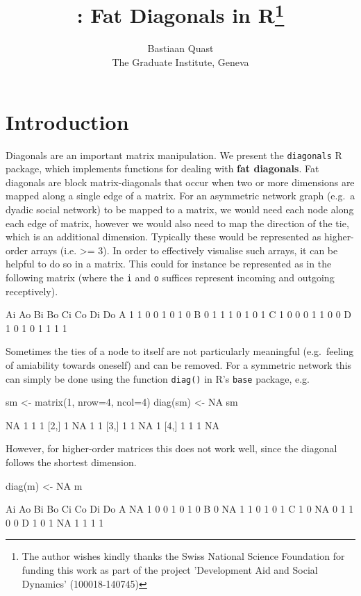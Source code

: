\documentclass[article]{jss}
\author{
Bastiaan Quast\\The Graduate Institute, Geneva
}
\title{\pkg{diagonals}: Fat Diagonals in
R\thanks{The author wishes kindly thanks the Swiss National Science Foundation for funding this work as part of the project 'Development Aid and Social Dynamics' (100018-140745)}}
\begin{document}
\section{Introduction}\label{introduction}

Diagonals are an important matrix manipulation. We present the
\texttt{diagonals} R package, which implements functions for dealing
with \textbf{fat diagonals}. Fat diagonals are block matrix-diagonals
that occur when two or more dimensions are mapped along a single edge of
a matrix. For an asymmetric network graph (e.g.~a dyadic social network)
to be mapped to a matrix, we would need each node along each edge of
matrix, however we would also need to map the direction of the tie,
which is an additional dimension. Typically these would be represented
as higher-order arrays (i.e. \textgreater{}= 3). In order to effectively
visualise such arrays, it can be helpful to do so in a matrix. This
could for instance be represented as in the following matrix (where the
\texttt{i} and \texttt{o} suffices represent incoming and outgoing
receptively).

\begin{CodeChunk}
\begin{CodeOutput}
  Ai Ao Bi Bo Ci Co Di Do
A  1  1  0  0  1  0  1  0
B  0  1  1  1  0  1  0  1
C  1  0  0  0  1  1  0  0
D  1  0  1  0  1  1  1  1
\end{CodeOutput}
\end{CodeChunk}

Sometimes the ties of a node to itself are not particularly meaningful
(e.g.~feeling of amiability towards oneself) and can be removed. For a
symmetric network this can simply be done using the function
\texttt{diag()} in R's \texttt{base} package, e.g.

\begin{CodeChunk}
\begin{CodeInput}
sm <- matrix(1, nrow=4, ncol=4)
diag(sm) <- NA
sm
\end{CodeInput}
\begin{CodeOutput}
     [,1] [,2] [,3] [,4]
[1,]   NA    1    1    1
[2,]    1   NA    1    1
[3,]    1    1   NA    1
[4,]    1    1    1   NA
\end{CodeOutput}
\end{CodeChunk}

However, for higher-order matrices this does not work well, since the
diagonal follows the shortest dimension.

\begin{CodeChunk}
\begin{CodeInput}
diag(m) <- NA
m
\end{CodeInput}
\begin{CodeOutput}
  Ai Ao Bi Bo Ci Co Di Do
A NA  1  0  0  1  0  1  0
B  0 NA  1  1  0  1  0  1
C  1  0 NA  0  1  1  0  0
D  1  0  1 NA  1  1  1  1
\end{CodeOutput}
\end{CodeChunk}
\end{document}
